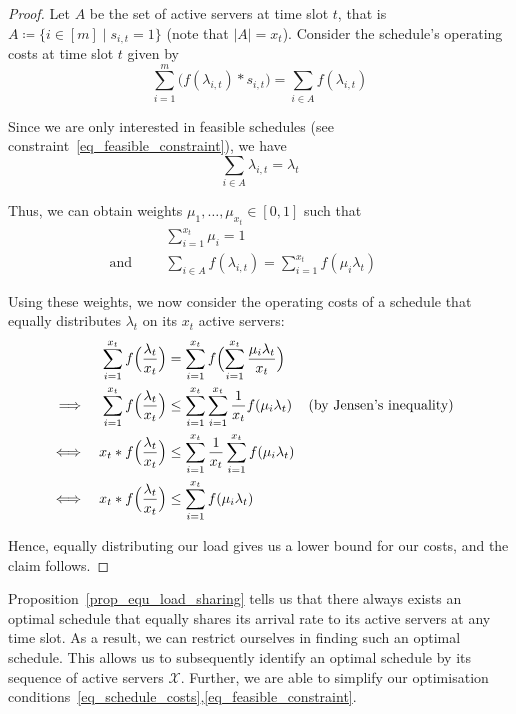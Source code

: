 \documentclass[hidelinks]{article}
\theoremstyle{plain}
\theoremstyle{definition}
\theoremstyle{rem}
\newcommand{\mx}{\mathcal{X}}
\begin{document}
\begin{proof}
Let $A$ be the set of active servers at time slot $t$, that is $A\coloneqq\{i\in[m]\mid s_{i,t}=1\}$ (note that $|A|=x_t$).
Consider the schedule's operating costs at time slot $t$ given by
\begin{equation*}
	\sum\limits_{i=1}^{m}\bigl(f(\lambda_{i,t})*s_{i,t}\bigr)=\sum\limits_{i\in A}f(\lambda_{i,t})
\end{equation*}

Since we are only interested in feasible schedules (see constraint~\eqref{eq_feasible_constraint}), we have 
\begin{equation*}
	\sum\limits_{i\in A}\lambda_{i,t}=\lambda_t
\end{equation*}

Thus, we can obtain weights $\mu_1,\ldots,\mu_{x_t}\in[0,1]$ such that
\begin{align*}
	&&&\sum\limits_{i=1}^{x_t}\mu_i=1&&&\\
	\text{and}&&&\sum\limits_{i\in A}f(\lambda_{i,t})=\sum\limits_{i=1}^{x_t}f(\mu_i\lambda_t)&&&
\end{align*}

Using these weights, we now consider the operating costs of a schedule that equally distributes $\lambda_t$ on its $x_t$ active servers:
\begin{align*}
	&&\sum\limits_{i=1}^{x_t}f\Bigl(\frac{\lambda_t}{x_t}\Bigr)&=\sum\limits_{i=1}^{x_t}f\Bigl(\sum\limits_{i=1}^{x_t}{\frac{\mu_i\lambda_t}{x_t}}\Bigr)\\
	\implies&&\sum\limits_{i=1}^{x_t}f\Bigl(\frac{\lambda_t}{x_t}\Bigr)&\le\sum\limits_{i=1}^{x_t}\sum\limits_{i=1}^{x_t}\frac{1}{x_t}f(\mu_i\lambda_t)&&\text{(by Jensen's inequality)}\\
	\iff&&x_t*f\Bigl(\frac{\lambda_t}{x_t}\Bigr)&\le\sum\limits_{i=1}^{x_t}\frac{1}{x_t}\sum\limits_{i=1}^{x_t}f(\mu_i\lambda_t)\\
	\iff&&x_t*f\Bigl(\frac{\lambda_t}{x_t}\Bigr)&\le\sum\limits_{i=1}^{x_t}f(\mu_i\lambda_t)
\end{align*}

Hence, equally distributing our load gives us a lower bound for our costs, and the claim follows.
\end{proof}

Proposition~\ref{prop_equ_load_sharing} tells us that there always exists an optimal schedule that equally shares its arrival rate to its active servers at any time slot. As a result, we can restrict ourselves in finding such an optimal schedule. This allows us to subsequently identify an optimal schedule by its sequence of active servers $\mx$. Further, we are able to simplify our optimisation conditions~\eqref{eq_schedule_costs},\eqref{eq_feasible_constraint}. 
\end{document}
